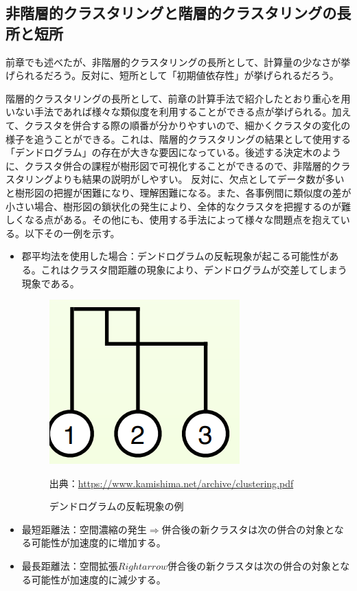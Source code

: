 \documentclass[dvipdfmx]{jsarticle}
\begin{document}
\subsection{非階層的クラスタリングと階層的クラスタリングの長所と短所}
前章でも述べたが、非階層的クラスタリングの長所として、計算量の少なさが挙げられるだろう。反対に、短所として「初期値依存性」が挙げられるだろう。\par
階層的クラスタリングの長所として、前章の計算手法で紹介したとおり重心を用いない手法であれば様々な類似度を利用することができる点が挙げられる。加えて、クラスタを併合する際の順番が分かりやすいので、細かくクラスタの変化の様子を追うことができる。これは、階層的クラスタリングの結果として使用する「デンドログラム」の存在が大きな要因になっている。後述する決定木のように、クラスタ併合の課程が樹形図で可視化することができるので、非階層的クラスタリングよりも結果の説明がしやすい。
反対に、欠点としてデータ数が多いと樹形図の把握が困難になり、理解困難になる。また、各事例間に類似度の差が小さい場合、樹形図の鎖状化の発生により、全体的なクラスタを把握するのが難しくなる点がある。その他にも、使用する手法によって様々な問題点を抱えている。以下その一例を示す。
\begin{itemize}
  \item 郡平均法を使用した場合：デンドログラムの反転現象が起こる可能性がある。これはクラスタ間距離の現象により、デンドログラムが交差してしまう現象である。
  \begin{figure}[H]
    \centering
    \includegraphics[scale=0.4]{images/dendoroHanten.png}
    \caption{デンドログラムの反転現象の例}
    出典：\url{https://www.kamishima.net/archive/clustering.pdf}
  \end{figure}
  \item 最短距離法：空間濃縮の発生$\Rightarrow$併合後の新クラスタは次の併合の対象となる可能性が加速度的に増加する。
  \item 最長距離法：空間拡張$Rightarrow$併合後の新クラスタは次の併合の対象となる可能性が加速度的に減少する。
\end{itemize}
\end{document}
